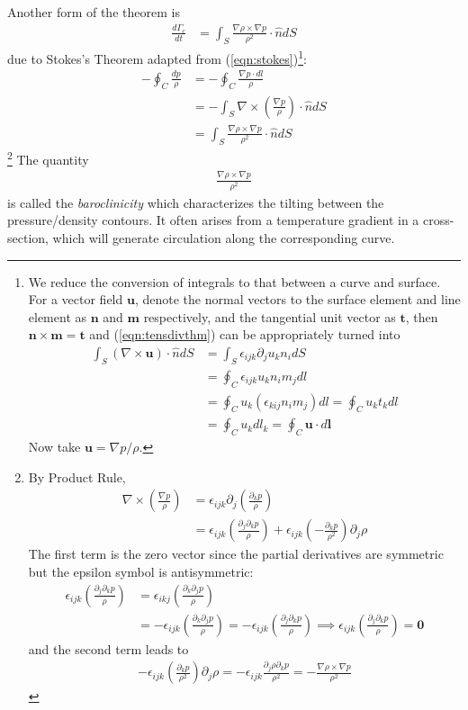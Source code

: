 Another form of the theorem is
\begin{align}
\frac{d\Gamma_c}{dt} &= \int_S \frac{\nabla \rho \times \nabla p}{\rho^2} \cdot \hat{n} dS     
\end{align}
due to Stokes's Theorem adapted from (\ref{eqn:stokes})\footnote{We reduce the conversion of integrals to that between a curve and surface. For a vector field $\textbf{u}$, denote the normal vectors to the surface element and line element as $\textbf{n}$ and $\textbf{m}$ respectively, and the tangential unit vector as $\textbf{t}$, then $\textbf{n} \times \textbf{m} = \textbf{t}$ and (\ref{eqn:tensdivthm}) can be appropriately turned into
\begin{align*}
\int_S (\nabla \times \textbf{u}) \cdot \hat{n} dS &= \int_S \epsilon_{ijk}\partial_j u_k n_i dS \\
&= \oint_C \epsilon_{ijk} u_k n_i m_j dl \\
&= \oint_C u_k (\epsilon_{kij} n_i m_j) dl = \oint_C u_k t_k dl \\
&= \oint_C u_k dl_k = \oint_C \textbf{u} \cdot d\textbf{l}
\end{align*}
Now take $\textbf{u} = \nabla p/\rho$.}:
\begin{align*}
- \oint_C \frac{dp}{\rho} &= - \oint_C \frac{\nabla p \cdot dl}{\rho} \\
&= - \int_S \nabla \times (\frac{\nabla p}{\rho}) \cdot \hat{n} dS \\
&= \int_S  \frac{\nabla \rho \times \nabla p}{\rho^2} \cdot \hat{n} dS     
\end{align*}
\footnote{By Product Rule, \begin{align*}
\nabla \times (\frac{\nabla p}{\rho}) &= \epsilon_{ijk}\partial_j(\frac{\partial_k p}{\rho}) \\
&= \epsilon_{ijk}(\frac{\partial_j\partial_k p}{\rho}) + \epsilon_{ijk}(-\frac{\partial_k p}{\rho^2})\partial_j\rho
\end{align*}
The first term is the zero vector since the partial derivatives are symmetric but the epsilon symbol is antisymmetric:
\vspace{\maxdimen}
\begin{align*}
\epsilon_{ijk}(\frac{\partial_j\partial_k p}{\rho}) &= \epsilon_{ikj}(\frac{\partial_k\partial_j p}{\rho}) \\
&= -\epsilon_{ijk}(\frac{\partial_k\partial_j p}{\rho}) = -\epsilon_{ijk}(\frac{\partial_j\partial_k p}{\rho}) \implies \epsilon_{ijk}(\frac{\partial_j\partial_k p}{\rho}) = \textbf{0}
\end{align*}
and the second term leads to
\begin{align*}
-\epsilon_{ijk}(\frac{\partial_k p}{\rho^2})\partial_j\rho = -\epsilon_{ijk}\frac{\partial_j\rho \partial_k p}{\rho^2} = -\frac{\nabla \rho \times \nabla p}{\rho^2}
\end{align*}
}
The quantity 
\begin{align}
\frac{\nabla \rho \times \nabla p}{\rho^2}    
\end{align}
is called the \textit{baroclinicity} which characterizes the tilting between the pressure/density contours. It often arises from a temperature gradient in a cross-section, which will generate circulation along the corresponding curve.


